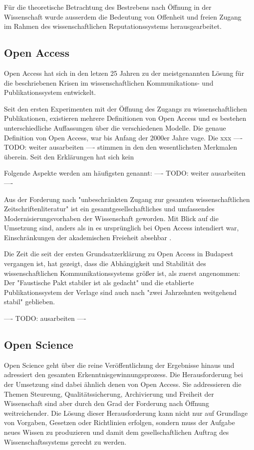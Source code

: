 Für die theoretische Betrachtung des Bestrebens nach Öffnung in der Wissenschaft wurde ausserdem die Bedeutung von Offenheit und freien Zugang im Rahmen des wissenschaftlichen Reputationssystems herausgearbeitet.

\subsection{Open Access}

Open Access hat sich in den letzen 25 Jahren zu der meistgenannten Lösung für die beschriebenen Krisen im wissenschaftlichen Kommunikations- und Publikationssystem entwickelt.

Seit den ersten Experimenten mit der Öffnung des Zugangs zu wissenschaftlichen Publikationen,  existieren mehrere Definitionen von Open Access und es bestehen unterschiedliche Auffassungen über die verschiedenen Modelle. Die genaue Definition von Open Access, war bis Anfang der 2000er Jahre vage. Die xxx ---- TODO: weiter ausarbeiten ---- stimmen in den den wesentlichsten Merkmalen überein\cite{albert_2006_open_implications}. Seit den Erklärungen hat sich kein

Folgende Aspekte werden am häufigsten genannt:
---- TODO: weiter ausarbeiten ----

Aus der Forderung nach "unbeschränkten Zugang zur gesamten wissenschaftlichen Zeitschriftenliteratur" ist ein gesamtgesellschaftliches und umfassendes Modernisierungsvorhaben der Wissenschaft geworden. Mit Blick auf die Umsetzung sind, anders als in es ursprünglich bei Open Access intendiert war, Einschränkungen der akademischen Freieheit absehbar \cite{hagner_2015_sache_buches}.

Die Zeit die seit der ersten Grundsatzerklärung zu Open Access in Budapest vergangen ist, hat gezeigt, dass die Abhängigkeit und Stabilität des wissenschaftlichen Kommunikationssystems größer ist, als zuerst angenommen: Der "Faustische Pakt stabiler ist als gedacht" \cite{hagner_2015_sache_buches} und die etablierte Publikationssystem der Verlage sind auch nach "zwei Jahrzehnten weitgehend stabil" \cite{Hanekop_2014} geblieben.

---- TODO: ausarbeiten ----

\subsection{Open Science}

Open Science geht über die reine Veröffentlichung der Ergebnisse hinaus und adressiert den gesamten Erkenntnisgewinnungsprozess. Die Herausforderung bei der Umsetzung sind dabei ähnlich denen von Open Access. Sie addressieren die Themen Steureung, Qualitätssicherung, Archivierung und Freiheit der Wissenschaft sind aber durch den Grad der Forderung nach Öffnung weitreichender. Die Lösung dieser Herausforderung kann nicht nur auf Grundlage von Vorgaben, Gesetzen oder Richtlinien erfolgen, sondern muss der Aufgabe neues Wissen zu produzieren und damit dem gesellschaftlichen Auftrag des Wissenschaftssystems gerecht zu werden.

